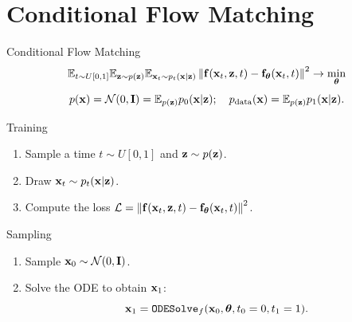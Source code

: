 \documentclass{beamer}
\begin{document}
\section{Conditional Flow Matching}
\begin{frame}{Conditional Flow Matching}
	\[
		\mathbb{E}_{t \sim U[0, 1]} \mathbb{E}_{\mathbf{z} \sim p(\mathbf{z})} \mathbb{E}_{\mathbf{x}_t \sim p_t(\mathbf{x} | \mathbf{z})}\left\| \mathbf{f}(\mathbf{x}_t, \mathbf{z}, t) - \mathbf{f}_{\boldsymbol{\theta}}(\mathbf{x}_t, t) \right\|^2 \rightarrow \min_{\boldsymbol{\theta}}
	\]
	\eqpause
	\[
		p(\mathbf{x}) = \mathcal{N}(0, \mathbf{I}) = \mathbb{E}_{p(\mathbf{z})} p_0(\mathbf{x} | \mathbf{z}); \quad p_{\text{data}}(\mathbf{x}) = \mathbb{E}_{p(\mathbf{z})} p_1(\mathbf{x} | \mathbf{z}).
	\]
	\eqpause
	\vspace{-0.3cm}
	\begin{block}{Training}
		\begin{enumerate}
			\item Sample a time $t \sim U[0, 1]$ and $\mathbf{z} \sim p(\mathbf{z})$.
			\item Draw $\mathbf{x}_t \sim p_t(\mathbf{x} | \mathbf{z})$.
			\item Compute the loss $ \mathcal{L} = \left\| \mathbf{f}(\mathbf{x}_t, \mathbf{z}, t) - \mathbf{f}_{\boldsymbol{\theta}}(\mathbf{x}_t, t) \right\|^2 $.
		\end{enumerate}
	\end{block}
	\eqpause
	\begin{block}{Sampling}
		\begin{enumerate}
			\item Sample $\mathbf{x}_0 \sim \mathcal{N}(0, \mathbf{I})$.
			\item Solve the ODE to obtain $\mathbf{x}_1$:
			\[
				\mathbf{x}_1 = \texttt{ODESolve}_f(\mathbf{x}_0, \boldsymbol{\theta}, t_0=0, t_1=1).
			\]
		\end{enumerate}
	\end{block}
\end{frame}
\end{document}
